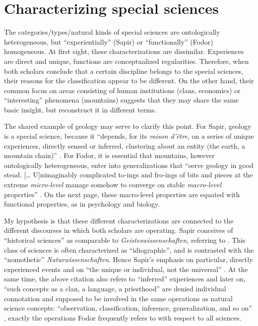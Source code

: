 \documentclass[output=paper]{langscibook}
\begin{document}
\section{Characterizing special sciences}
\label{sec:elffers:characterizing}

The categories/types/natural kinds of special sciences are ontologically heterogeneous, but
``experientially'' (Sapir) or ``functionally'' (Fodor) homogeneous. At first sight, these characterizations are dissimilar. Experiences are direct and unique, functions are conceptualized regularities. Therefore, when both scholars conclude that a certain discipline belongs to the special sciences, their reasons for the classification appear to be different. On the other hand, their common focus on areas consisting of human institutions (clans, economics) or ``interesting'' phenomena (mountains) suggests that they may share the same basic insight, but reconstruct it in different terms.

The shared example of geology may serve to clarify this point. For Sapir, geology is a special science, because it ``depends, for its \emph{raison d’être}, on a series of unique experiences, directly sensed or inferred, clustering about an entity (the earth, a mountain chain)'' \citep[445]{Sapir1917}. For Fodor, it is essential that mountains, however ontologically heterogeneous, enter into generalizations that ``serve geology in good stead. [… U]nimaginably complicated to-ings and fro-ings of bits and pieces at the extreme \emph{micro-level} manage somehow to converge on stable \emph{macro-level} properties'' \citep[160]{Fodor1997}. On the next page, these macro-level properties are equated with functional properties, as in psychology and biology.

My hypothesis is that these different characterizations are connected to the different discourses in which both scholars are operating. Sapir conceives of ``historical sciences'' as comparable to \emph{Geisteswissenschaften}, referring to \citet{Rickert1913}. This class of sciences is often characterized as ``idiographic'', and is contrasted with the ``nomothetic'' \emph{Naturwissenschaften}. Hence Sapir's emphasis on particular, directly experienced events and on ``the unique or individual, not the universal'' \citep[446]{Sapir1917}. At the same time, the above citation also refers to ``inferred'' experiences and later on, ``such concepts as a clan, a language, a priesthood'' are denied individual connotation and supposed to be involved in the same operations as natural science concepts: ``observation, classification, inference, generalization, and so on'' \citep[446]{Sapir1917}, exactly the operations Fodor frequently refers to with respect to all sciences.
\end{document}
